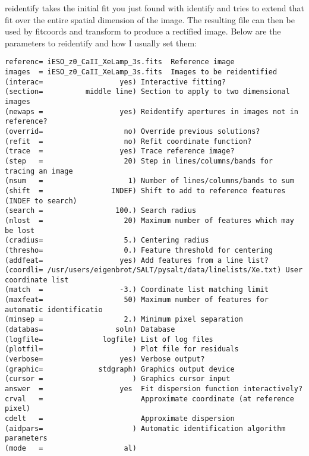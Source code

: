 \documentclass[letter,11pt,oneside]{article}
\begin{document}
reidentify takes the initial fit you just found with identify and
tries to extend that fit over the entire spatial dimension of the
image. The resulting file can then be used by fitcoords and transform
to produce a rectified image. Below are the parameters to reidentify
and how I usually set them:

\begingroup \fontsize{10pt}{10pt}
\selectfont
\begin{verbatim} 
referenc= iESO_z0_CaII_XeLamp_3s.fits  Reference image
images  = iESO_z0_CaII_XeLamp_3s.fits  Images to be reidentified
(interac=                  yes) Interactive fitting?
(section=          middle line) Section to apply to two dimensional images
(newaps =                  yes) Reidentify apertures in images not in reference?
(overrid=                   no) Override previous solutions?
(refit  =                   no) Refit coordinate function?
(trace  =                  yes) Trace reference image?
(step   =                   20) Step in lines/columns/bands for tracing an image
(nsum   =                    1) Number of lines/columns/bands to sum
(shift  =                INDEF) Shift to add to reference features (INDEF to search)
(search =                 100.) Search radius
(nlost  =                   20) Maximum number of features which may be lost
(cradius=                   5.) Centering radius
(thresho=                   0.) Feature threshold for centering
(addfeat=                  yes) Add features from a line list?
(coordli= /usr/users/eigenbrot/SALT/pysalt/data/linelists/Xe.txt) User coordinate list
(match  =                  -3.) Coordinate list matching limit
(maxfeat=                   50) Maximum number of features for automatic identificatio
(minsep =                   2.) Minimum pixel separation
(databas=                 soln) Database
(logfile=              logfile) List of log files
(plotfil=                     ) Plot file for residuals
(verbose=                  yes) Verbose output?
(graphic=             stdgraph) Graphics output device
(cursor =                     ) Graphics cursor input
answer  =                  yes  Fit dispersion function interactively?
crval   =                       Approximate coordinate (at reference pixel)
cdelt   =                       Approximate dispersion
(aidpars=                     ) Automatic identification algorithm parameters
(mode   =                   al)
\end{verbatim}
\endgroup
\end{document}
